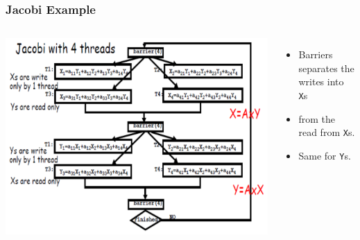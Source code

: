 \documentclass{beamer}
\begin{document}
\begin{frame}[fragile,t]
\frametitle{Jacobi Example}

\begin{columns}
\includegraphics[width=58ex]{Ch7Figs/Jacobi}\pause
{}
\begin{itemize}
    \item Barriers separates the writes into {\tt X}s 
    \item from the read from {\tt X}s. 
    \item Same for {\tt Y}s.
\end{itemize}
\end{columns}
\bigskip

\end{frame}
\end{document}
